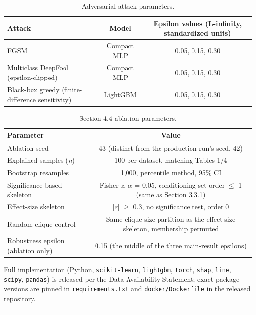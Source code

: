 \begin{table}[H] \caption{Adversarial attack parameters.\label{tabA4}} \begin{tabularx}{\textwidth}{LCC} \toprule \textbf{Attack} & \textbf{Model} & \textbf{Epsilon values (L-infinity, standardized units)} \\ \midrule FGSM & Compact MLP & 0.05, 0.15, 0.30 \\ Multiclass DeepFool (epsilon-clipped) & Compact MLP & 0.05, 0.15, 0.30 \\ Black-box greedy (finite-difference sensitivity) & LightGBM & 0.05, 0.15, 0.30 \\ \bottomrule \end{tabularx} \end{table}

\begin{table}[H] \caption{Section 4.4 ablation parameters.\label{tabA5}} \begin{tabularx}{\textwidth}{LC} \toprule \textbf{Parameter} & \textbf{Value} \\ \midrule Ablation seed & 43 (distinct from the production run's seed, 42) \\ Explained samples (\textit{n}) & 100 per dataset, matching Tables 1/4 \\ Bootstrap resamples & 1,000, percentile method, 95\% CI \\ Significance-based skeleton & Fisher-\textit{z}, $\alpha$ = 0.05, conditioning-set order $\leq$ 1 (same as Section 3.3.1) \\ Effect-size skeleton & |\textit{r}| $\geq$ 0.3, no significance test, order 0 \\ Random-clique control & Same clique-size partition as the effect-size skeleton, membership permuted \\ Robustness epsilon (ablation only) & 0.15 (the middle of the three main-result epsilons) \\ \bottomrule \end{tabularx} \end{table}

Full implementation (Python, \texttt{scikit-learn}, \texttt{lightgbm}, \texttt{torch}, \texttt{shap}, \texttt{lime}, \texttt{scipy}, \texttt{pandas}) is released per the Data Availability Statement; exact package versions are pinned in \texttt{requirements.txt} and \texttt{docker/Dockerfile} in the released repository.

\begin{center}\rule{0.5\linewidth}{0.5pt}\end{center}
